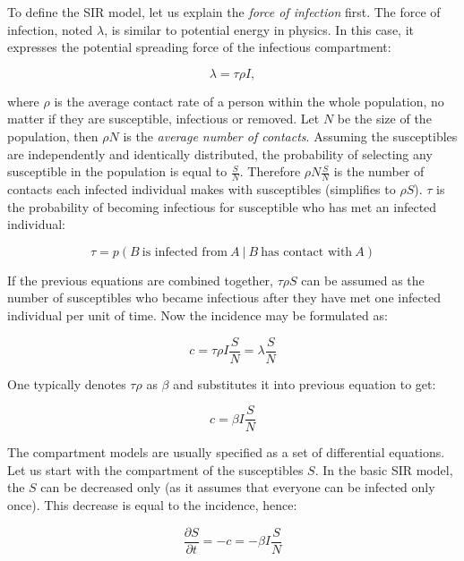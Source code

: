 \documentclass[
  digital, %
  oneside, %
  lof,     %
  lot,     %
]{fithesis4}
\begin{document}
To define the SIR model, let us explain the \textit{force of infection} first.
The force of infection, noted $\lambda$, is similar to potential energy in physics. In this case, it expresses 
the potential spreading force of the infectious compartment:

\begin{equation}
	\lambda = \tau \rho I,
\end{equation}

\noindent
where $\rho$ is the average contact rate of a person within the whole population, no matter if they are susceptible, infectious or removed.
Let $N$ be the size of the population, then $\rho N$ is the \textit{average number of contacts}.
Assuming the susceptibles are independently and identically distributed, the probability of selecting any susceptible in the population is equal to $\frac{S}{N}$.
Therefore $\rho N\frac{S}{N}$ is the number of contacts each infected individual makes with susceptibles (simplifies to $\rho S$).
$\tau$ is the probability of becoming infectious for susceptible who has met an infected individual:

\begin{equation}
	\tau = p \left( B~\textrm{is infected from}~A~|~B~\textrm{has contact with}~A \right)
\end{equation}

If the previous equations are combined together, $\tau \rho S$ can be assumed as the number of susceptibles who became infectious after they have met one infected individual per unit of time.
Now the incidence may be formulated as:

\begin{equation}
	c = \tau \rho I \frac{S}{N} = \lambda \frac{S}{N}
\end{equation}

One typically denotes $\tau \rho$ as $\beta$ and substitutes it into previous equation to get:

\begin{equation}
	c = \beta I \frac{S}{N}
\end{equation}

The compartment models are usually specified as a set of differential equations.
Let us start with the compartment of the susceptibles $S$. In the basic SIR model, the $S$ can be decreased only (as it assumes that everyone can be infected only once).
This decrease is equal to the incidence, hence:

\begin{equation}\label{eq:sir-model-incidence}
	\frac{\partial{S}}{\partial{t}} = -c = -\beta I \frac{S}{N}
\end{equation}
\end{document}
